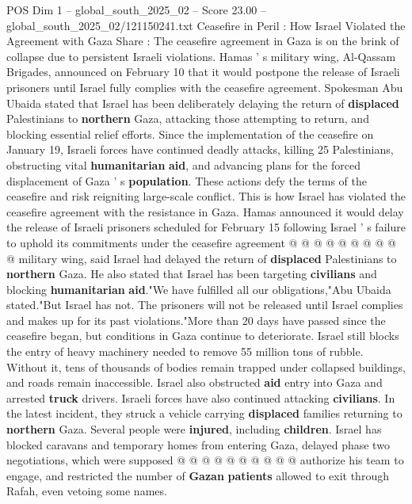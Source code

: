 \begin{textsample}{POS Dim 1 – global\_south\_2025\_02 – Score 23.00 – global\_south\_2025\_02/121150241.txt}  \label{ex:f1_pos_412}
Ceasefire in Peril : How Israel Violated the Agreement with Gaza Share : The ceasefire agreement in Gaza is on the brink of collapse due to persistent Israeli violations.
Hamas ' s military wing, Al-Qassam Brigades, announced on February 10 that it would postpone the release of Israeli prisoners until Israel fully complies with the ceasefire agreement.
Spokesman Abu Ubaida stated that Israel has been deliberately delaying the return of \textbf{displaced} Palestinians to \textbf{northern} Gaza, attacking those attempting to return, and blocking essential relief efforts.
Since the implementation of the ceasefire on January 19, Israeli forces have continued deadly attacks, killing 25 Palestinians, obstructing vital \textbf{humanitarian} \textbf{aid}, and advancing plans for the forced displacement of Gaza ' s \textbf{population}.
These actions defy the terms of the ceasefire and risk reigniting large-scale conflict.
This is how Israel has violated the ceasefire agreement with the resistance in Gaza.
Hamas announced it would delay the release of Israeli prisoners scheduled for February 15 following Israel ' s failure to uphold its commitments under the ceasefire agreement @ @ @ @ @ @ @ @ @ @ military wing, said Israel had delayed the return of \textbf{displaced} Palestinians to \textbf{northern} Gaza.
He also stated that Israel has been targeting \textbf{civilians} and blocking \textbf{humanitarian} \textbf{aid}."We have fulfilled all our obligations,"Abu Ubaida stated."But Israel has not.
The prisoners will not be released until Israel complies and makes up for its past violations."More than 20 days have passed since the ceasefire began, but conditions in Gaza continue to deteriorate.
Israel still blocks the entry of heavy machinery needed to remove 55 million tons of rubble.
Without it, tens of thousands of bodies remain trapped under collapsed buildings, and roads remain inaccessible.
Israel also obstructed \textbf{aid} entry into Gaza and arrested \textbf{truck} drivers.
Israeli forces have also continued attacking \textbf{civilians}.
In the latest incident, they struck a vehicle carrying \textbf{displaced} families returning to \textbf{northern} Gaza.
Several people were \textbf{injured}, including \textbf{children}.
Israel has blocked caravans and temporary homes from entering Gaza, delayed phase two negotiations, which were supposed @ @ @ @ @ @ @ @ @ @ authorize his team to engage, and restricted the number of \textbf{Gazan} \textbf{patients} allowed to exit through Rafah, even vetoing some names.

\end{textsample}
